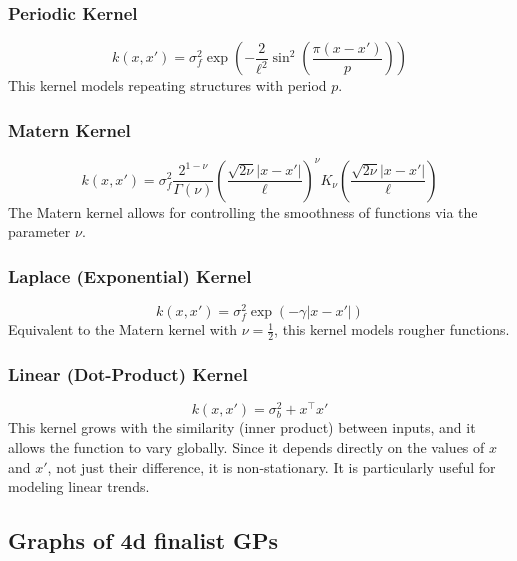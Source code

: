 \documentclass{ucdgradtaughtthesis}
\begin{document}
\subsubsection*{Periodic Kernel}
\[
k(x, x') = \sigma_f^2 \exp\left( -\frac{2}{\ell^2} \sin^2\left( \frac{\pi (x - x')}{p} \right) \right)
\]
This kernel models repeating structures with period \( p \).

\subsubsection*{Matern Kernel}
\[
k(x, x') = \sigma_f^2 \frac{2^{1-\nu}}{\Gamma(\nu)} \left( \frac{\sqrt{2\nu} |x - x'|}{\ell} \right)^\nu K_\nu\left( \frac{\sqrt{2\nu} |x - x'|}{\ell} \right)
\]
The Matern kernel allows for controlling the smoothness of functions via the parameter \( \nu \).


\subsubsection*{Laplace (Exponential) Kernel}
\[
k(x, x') = \sigma_f^2 \exp\left( -\gamma |x - x'| \right)
\]
Equivalent to the Matern kernel with \( \nu = \frac{1}{2} \), this kernel models rougher functions.


\subsubsection*{Linear (Dot-Product) Kernel}
\[
k(x, x') = \sigma_b^2 + x^\top x'
\]
This kernel grows with the similarity (inner product) between inputs, and it allows the function to vary globally. Since it depends directly on the values of \( x \) and \( x' \), not just their difference, it is non-stationary. It is particularly useful for modeling linear trends.


\subsection{Graphs of 4d finalist GPs}
\label{appendix:C}
\end{document}
